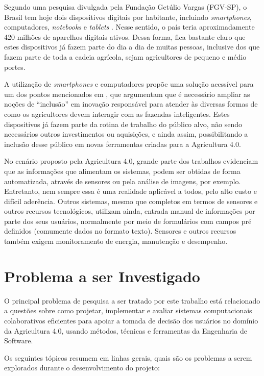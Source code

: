 Segundo uma pesquisa divulgada pela Fundação Getúlio Vargas (FGV-SP), o Brasil tem hoje dois dispositivos digitais por habitante, incluindo \textit{smartphones}, computadores, \textit{notebooks} e \textit{tablets} \cite{FGV:2020}. Nesse sentido, o país teria aproximadamente 420 milhões de aparelhos digitais ativos. Dessa forma, fica bastante claro que estes dispositivos já fazem parte do dia a dia de muitas pessoas, inclusive dos que fazem parte de toda a cadeia agrícola, sejam agricultores de pequeno e médio portes.

A utilização de \textit{smartphones} e computadores propõe uma solução acessível para um dos pontos mencionados em , que argumentam que é necessário ampliar as noções de ``inclusão'' em inovação responsável para atender às diversas formas de como os agricultores devem interagir com as fazendas inteligentes. Estes dispositivos já fazem parte da rotina de trabalho do público alvo, não sendo necessários outros investimentos ou aquisições, e ainda assim, possibilitando a inclusão desse público em novas ferramentas criadas para a Agricultura 4.0.

No cenário proposto pela Agricultura 4.0, grande parte dos trabalhos evidenciam que as informações que alimentam os sistemas, podem ser obtidas de forma automatizada, através de sensores ou pela análise de imagens, por exemplo. Entretanto, nem sempre essa é uma realidade aplicável a todos, pelo alto custo e difícil aderência. Outros sistemas, mesmo que completos em termos de sensores e outros recursos tecnológicos, utilizam ainda, entrada manual de informações por parte dos seus usuários, normalmente por meio de formulários com campos pré definidos (comumente dados no formato texto). Sensores e outros recursos também exigem monitoramento de energia, manutenção e desempenho.

\section{Problema a ser Investigado}
\label{sec:problema_investigado}

O principal problema de pesquisa a ser tratado por este trabalho está relacionado a questões sobre como projetar, implementar e avaliar sistemas computacionais colaborativos eficientes para apoiar a tomada de decisão dos usuários no domínio da Agricultura 4.0, usando métodos, técnicas e ferramentas da Engenharia de Software.

Os seguintes tópicos resumem em linhas gerais, quais são os problemas a serem explorados durante o desenvolvimento do projeto:

